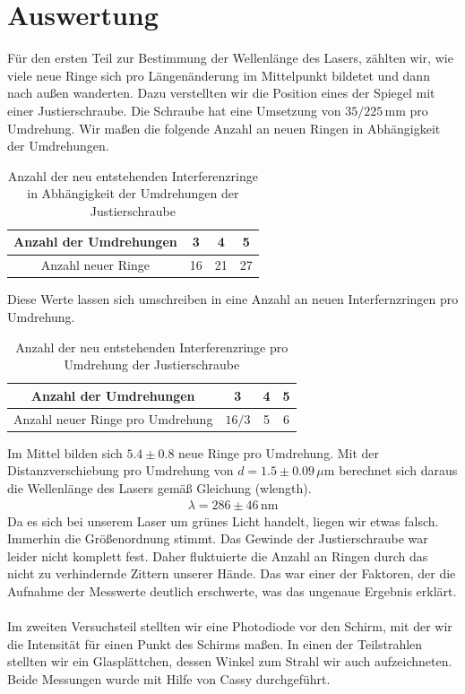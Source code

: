 \chapter{Auswertung}
Für den ersten Teil zur Bestimmung der Wellenlänge des Lasers, zählten wir, wie viele neue Ringe sich pro Längenänderung im Mittelpunkt bildetet und dann nach außen wanderten. Dazu verstellten wir die Position eines der Spiegel mit einer Justierschraube. Die Schraube hat eine Umsetzung von $35/225\,\text{mm}$ pro Umdrehung. Wir maßen die folgende Anzahl an neuen Ringen in Abhängigkeit der Umdrehungen.
\begin{table}
    \begin{tabular}{c|c|c|c}
        Anzahl der Umdrehungen&3&4&5\\\hline
        Anzahl neuer Ringe&16&21&27        
    \end{tabular}
    \caption{Anzahl der neu entstehenden Interferenzringe in Abhängigkeit der Umdrehungen der Justierschraube}
\end{table}
Diese Werte lassen sich umschreiben in eine Anzahl an neuen Interfernzringen pro Umdrehung.
\begin{table}
    \begin{tabular}{c|c|c|c}
        Anzahl der Umdrehungen&3&4&5\\\hline
        Anzahl neuer Ringe pro Umdrehung&$16/3$&5&6       
    \end{tabular}
    \caption{Anzahl der neu entstehenden Interferenzringe pro Umdrehung der Justierschraube}
\end{table}
Im Mittel bilden sich $5.4\pm0.8$ neue Ringe pro Umdrehung. Mit der Distanzverschiebung pro Umdrehung von $d=1.5\pm0.09\,\mu\text{m}$ berechnet sich daraus die Wellenlänge des Lasers gemäß Gleichung (wlength).
\begin{align*}
    \lambda=286\pm46\,\text{nm}
\end{align*}
Da es sich bei unserem Laser um grünes Licht handelt, liegen wir etwas falsch. Immerhin die Größenordnung stimmt. Das Gewinde der Justierschraube war leider nicht komplett fest. Daher fluktuierte die Anzahl an Ringen durch das nicht zu verhindernde Zittern unserer Hände. Das war einer der Faktoren, der die Aufnahme der Messwerte deutlich erschwerte, was das ungenaue Ergebnis erklärt.\\\\
Im zweiten Versuchsteil stellten wir eine Photodiode vor den Schirm, mit der wir die Intensität für einen Punkt des Schirms maßen. In einen der Teilstrahlen stellten wir ein Glasplättchen, dessen Winkel zum Strahl wir auch aufzeichneten. Beide Messungen wurde mit Hilfe von Cassy durchgeführt.
